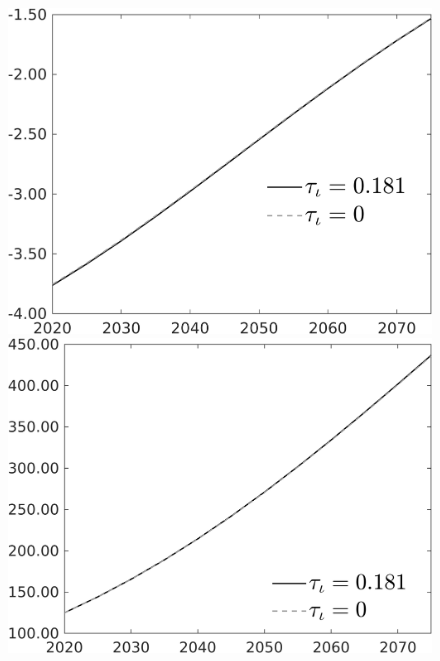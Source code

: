 \documentclass[12pt]{article}
\begin{document}
\begin{figure}[h!!]
\begin{minipage}[]{0.32\textwidth}
\end{minipage}		\begin{minipage}[]{0.32\textwidth}
\includegraphics[width=1\textwidth]{../../codding_model/own_basedOnFried/optimalPol_010922_revision/figures/all_13Sept22/PerdifNoTauf_Equlab_regime0_CompTaul_pn_spillover0_nsk0_xgr1_knspil1_sep1_LFlimit0_emsbase0_countec0_GovRev0_etaa0.79_lgd1.png}
\end{minipage}		\begin{minipage}[]{0.32\textwidth}
\includegraphics[width=1\textwidth]{../../codding_model/own_basedOnFried/optimalPol_010922_revision/figures/all_13Sept22/PerdifNoTauf_Equlab_regime0_CompTaul_pepn_spillover0_nsk0_xgr1_knspil1_sep1_LFlimit0_emsbase0_countec0_GovRev0_etaa0.79_lgd1.png}

\end{minipage}
\end{figure}
\end{document}
